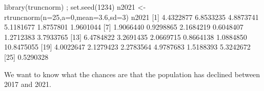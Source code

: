 \documentclass[
]{book}
\newenvironment{Shaded}{\begin{snugshade}}{\end{snugshade}}
\newcommand{\AttributeTok}[1]{\textcolor[rgb]{0.77,0.63,0.00}{#1}}
\newcommand{\DecValTok}[1]{\textcolor[rgb]{0.00,0.00,0.81}{#1}}
\newcommand{\FloatTok}[1]{\textcolor[rgb]{0.00,0.00,0.81}{#1}}
\newcommand{\FunctionTok}[1]{\textcolor[rgb]{0.00,0.00,0.00}{#1}}
\newcommand{\NormalTok}[1]{#1}
\newcommand{\OtherTok}[1]{\textcolor[rgb]{0.56,0.35,0.01}{#1}}
\newcommand{\SpecialCharTok}[1]{\textcolor[rgb]{0.00,0.00,0.00}{#1}}
\newcommand{\StringTok}[1]{\textcolor[rgb]{0.31,0.60,0.02}{#1}}
\begin{document}
\begin{Shaded}
\begin{Highlighting}[]
\FunctionTok{library}\NormalTok{(truncnorm) ; }\FunctionTok{set.seed}\NormalTok{(}\DecValTok{1234}\NormalTok{)}
\NormalTok{n2021 }\OtherTok{\textless{}{-}} \FunctionTok{rtruncnorm}\NormalTok{(}\AttributeTok{n=}\DecValTok{25}\NormalTok{,}\AttributeTok{a=}\DecValTok{0}\NormalTok{,}\AttributeTok{mean=}\FloatTok{3.6}\NormalTok{,}\AttributeTok{sd=}\DecValTok{3}\NormalTok{)}
\NormalTok{n2021}
\NormalTok{ [}\DecValTok{1}\NormalTok{]  }\FloatTok{4.4322877}  \FloatTok{6.8533235}  \FloatTok{4.8873741}  \FloatTok{5.1181677}  \FloatTok{1.8757801}  \FloatTok{1.9601044}
\NormalTok{ [}\DecValTok{7}\NormalTok{]  }\FloatTok{1.9066440}  \FloatTok{0.9298865}  \FloatTok{2.1684219}  \FloatTok{0.6048407}  \FloatTok{1.2712383}  \FloatTok{3.7933765}
\NormalTok{[}\DecValTok{13}\NormalTok{]  }\FloatTok{6.4784822}  \FloatTok{3.2691435}  \FloatTok{2.0669715}  \FloatTok{0.8664138}  \FloatTok{1.0884850} \FloatTok{10.8475055}
\NormalTok{[}\DecValTok{19}\NormalTok{]  }\FloatTok{4.0022647}  \FloatTok{2.1279423}  \FloatTok{2.2783564}  \FloatTok{4.9787683}  \FloatTok{1.5188393}  \FloatTok{5.3242672}
\NormalTok{[}\DecValTok{25}\NormalTok{]  }\FloatTok{0.5290328}
\end{Highlighting}
\end{Shaded}

We want to know what the chances are that the population has declined between 2017 and 2021.

\begin{Shaded}
\end{Shaded}
\end{document}
